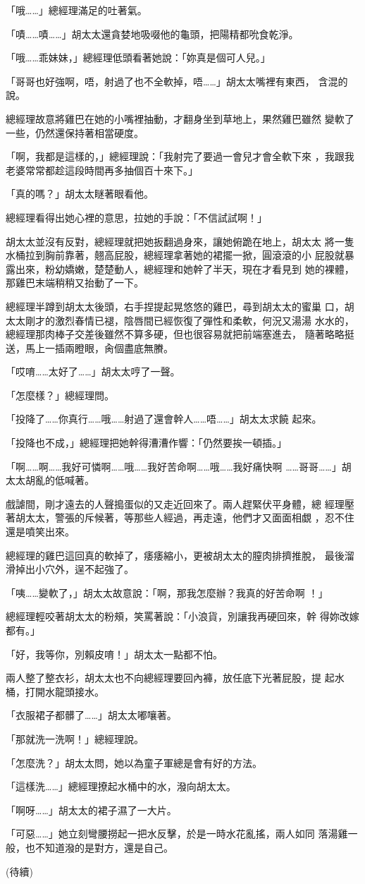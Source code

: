 「哦……」總經理滿足的吐著氣。

「嘖……嘖……」胡太太還貪婪地吸啜他的龜頭，把陽精都吮食乾淨。

「哦……乖妹妹，」總經理低頭看著她說：「妳真是個可人兒。」

「哥哥也好強啊，唔，射過了也不全軟掉，唔……」胡太太嘴裡有東西，
含混的說。

總經理故意將雞巴在她的小嘴裡抽動，才翻身坐到草地上，果然雞巴雖然
變軟了一些，仍然還保持著相當硬度。

「啊，我都是這樣的，」總經理說：「我射完了要過一會兒才會全軟下來
，我跟我老婆常常都趁這段時間再多抽個百十來下。」

「真的嗎？」胡太太瞇著眼看他。

總經理看得出她心裡的意思，拉她的手說：「不信試試啊！」

胡太太並沒有反對，總經理就把她扳翻過身來，讓她俯跪在地上，胡太太
將一隻水桶拉到胸前靠著，翹高屁股，總經理拿著她的裙擺一掀，圓滾滾的小
屁股就暴露出來，粉幼嬌嫩，楚楚動人，總經理和她幹了半天，現在才看見到
她的裸體，那雞巴末端稍稍又抬動了一下。

總經理半蹲到胡太太後頭，右手捏提起晃悠悠的雞巴，尋到胡太太的蜜巢
口，胡太太剛才的激烈春情已褪，陰唇間已經恢復了彈性和柔軟，何況又湯湯
水水的，總經理那肉棒子交差後雖然不算多硬，但也很容易就把前端塞進去，
隨著略略挺送，馬上一插兩瞪眼，肏個盡底無賸。

「哎唷……太好了……」胡太太哼了一聲。

「怎麼樣？」總經理問。

「投降了……你真行……哦……射過了還會幹人……唔……」胡太太求饒
起來。

「投降也不成，」總經理把她幹得漕漕作響：「仍然要挨一頓插。」

「啊……啊……我好可憐啊……哦……我好苦命啊……哦……我好痛快啊
……哥哥……」胡太太胡亂的低喊著。

戲謔間，剛才遠去的人聲搗蛋似的又走近回來了。兩人趕緊伏平身體，總
經理壓著胡太太，警張的斥候著，等那些人經過，再走遠，他們才又面面相覷
，忍不住還是噴笑出來。

總經理的雞巴這回真的軟掉了，痿痿縮小，更被胡太太的膣肉排擠推脫，
最後溜滑掉出小穴外，逞不起強了。

「咦……變軟了，」胡太太故意說：「啊，那我怎麼辦？我真的好苦命啊
！」

總經理輕咬著胡太太的粉頰，笑罵著說：「小浪貨，別讓我再硬回來，幹
得妳改嫁都有。」

「好，我等你，別賴皮唷！」胡太太一點都不怕。

兩人整了整衣衫，胡太太也不向總經理要回內褲，放任底下光著屁股，提
起水桶，打開水龍頭接水。

「衣服裙子都髒了……」胡太太嘟嚷著。

「那就洗一洗啊！」總經理說。

「怎麼洗？」胡太太問，她以為童子軍總是會有好的方法。

「這樣洗……」總經理撩起水桶中的水，潑向胡太太。

「啊呀……」胡太太的裙子濕了一大片。

「可惡……」她立刻彎腰撈起一把水反擊，於是一時水花亂搖，兩人如同
落湯雞一般，也不知道潑的是對方，還是自己。

(待續)










